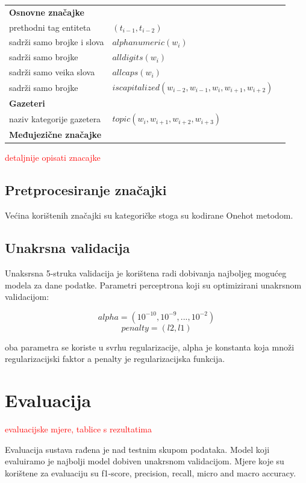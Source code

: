 \documentclass[times, utf8, seminar]{fer}
\newcommand\myworries[1]{\textcolor{red}{#1}}
\begin{document}
\begin{center}
\begin{tabular}{llr}
\hline
\textbf{Osnovne značajke} & \\
prethodni tag entiteta & $ (t_{i-1},t_{i-2}) $\\ 
sadrži samo brojke i slova & $ alphanumeric(w_i) $\\ 
sadrži samo brojke  & $ alldigits(w_i) $\\ 
sadrži samo veika slova & $ allcaps(w_i) $\\ 
sadrži samo brojke & $ iscapitalized(w_{i-2}, w_{i-1}, w_{i}, w_{i+1}, w_{i+2}) $\\
\textbf{Gazeteri} & \\
naziv kategorije gazetera  & $ topic(w_{i}, w_{i+1}, w_{i+2}, w_{i+3}) $\\
\textbf{Međujezične značajke} & \\
\hline
\end{tabular}
\end{center}

\myworries{detaljnije opisati znacajke}
\section{Pretprocesiranje značajki}
Većina korištenih značajki su kategoričke stoga su kodirane Onehot metodom.
\section{Unakrsna validacija}
Unaksrsna 5-struka validacija je korištena radi dobivanja najboljeg mogućeg modela za dane podatke. Parametri perceptrona koji su optimizirani unakrsnom validacijom: 

\[ alpha = (10^{-10}, 10^{-9}, ..., 10^{-2}) \]
\[ penalty = (l2, l1) \]

oba parametra se koriste u svrhu regularizacije,  alpha je konstanta koja množi regularizacijski faktor a penalty je regularizacijska funkcija.
\chapter{Evaluacija}
\myworries{evaluacijske mjere, tablice s rezultatima}

Evaluacija sustava rađena je nad testnim skupom podataka. Model koji evaluiramo je najbolji model dobiven unakrsnom validacijom. Mjere koje su korištene za evaluaciju su f1-score, precision, recall, micro and macro accuracy.
\end{document}
